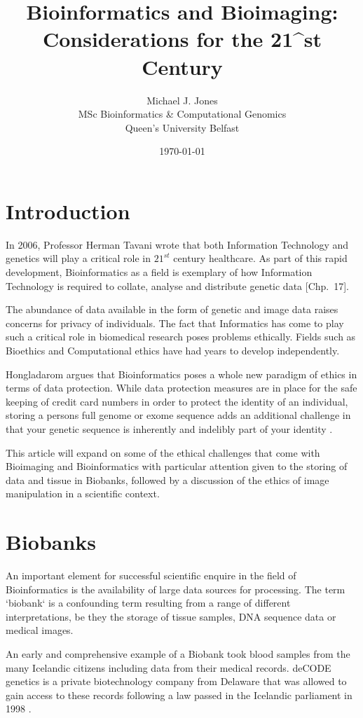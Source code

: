 \documentclass[a4paper, 12pt]{article}
\title{Bioinformatics and Bioimaging: Considerations for the 21^{st} Century}
\author{Michael J. Jones \\
  MSc Bioinformatics \& Computational Genomics \\
  Queen's University Belfast}
\date{\today}
\begin{document}
\section{Introduction}
In 2006, Professor Herman Tavani wrote that both Information Technology and
genetics will play a critical role in $21^{st}$ century healthcare. As part of
this rapid development, Bioinformatics as a field is exemplary of how
Information Technology is required to collate, analyse and distribute genetic
data \cite{tavani2006ethics}[Chp.~17].

The abundance of data available in the form of genetic and image data raises
concerns for privacy of individuals. The fact that Informatics has come to
play such a critical role in biomedical research poses problems ethically.
Fields such as Bioethics and Computational ethics have had years to develop
independently.

Hongladarom argues that Bioinformatics poses a whole new paradigm of ethics in
terms of data protection. While data protection measures are in place for the
safe keeping of credit card numbers in order to protect the identity of an
individual, storing a persons full genome or exome sequence adds an additional
challenge in that your genetic sequence is inherently and indelibly part of
your identity \cite{hongladarom2006ethics}.

This article will expand on some of the ethical challenges that come with
Bioimaging and Bioinformatics with particular attention given to the storing
of data and tissue in Biobanks, followed by a discussion of the ethics of
image manipulation in a scientific context.

\section{Biobanks}
An important element for successful scientific enquire in the field of
Bioinformatics is the availability of large data sources for processing. The
term `biobank` is a confounding term resulting from a range of different
interpretations, be they the storage of tissue samples, DNA sequence data or
medical images.

An early and comprehensive example of a Biobank took blood samples from the
many Icelandic citizens including data from their medical records. deCODE
genetics is a private biotechnology company from Delaware that was allowed to
gain access to these records following a law passed in the Icelandic parliament
in 1998 \cite{chadwick1999icelandic}.
\end{document}
